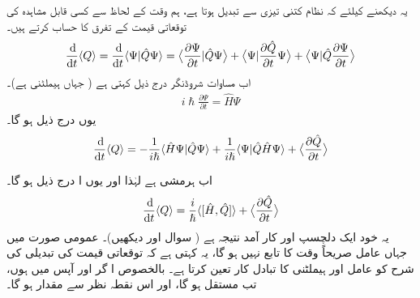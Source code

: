  یہ دیکھنے کیلئے کہ نظام کتنی تیزی سے تبدیل ہوتا ہے،   ہم  وقت کے لحاظ سے کسی قابل مشاہدہ  کی توقعاتی قیمت  کے  تفرق کا حساب  کرتے ہیں۔ 
\begin{align*}
\frac{\dif}{\dif t} \langle Q \rangle = \frac{\dif}{\dif t} \langle \Psi | \hat{Q} \Psi \rangle = \big\langle \frac{\partial\Psi}{\partial t} \vert \hat{Q} \Psi \big\rangle + \big\langle \Psi \vert \frac{\partial \hat{Q}}{\partial t} \Psi \big\rangle + \big\langle \Psi \vert \hat{Q} \frac{\partial \Psi}{\partial t} \big\rangle 
\end{align*}
اب مساوات  شروڈنگر   درج ذیل کہتی ہے (  جہاں  ہیملٹنی ہے)۔ 
\begin{align*}
i \hslash \frac{\partial \Psi}{\partial t} = \hat{H} \Psi
\end{align*}
یوں درج ذیل ہو گا۔ 
\begin{align*}
\frac{\dif}{\dif t}\langle Q\rangle =-\frac{1}{i \hslash} \langle \hat{H}\Psi | \hat{Q} \Psi\rangle+\frac{1}{i\hslash}\langle \Psi |\hat{Q} \hat{H} \Psi\rangle +\big \langle \frac{\partial \hat{Q}}{\partial t}\big \rangle
\end{align*}

اب  ہرمشی ہے لہٰذا   اور یوں ا درج ذیل ہو گا۔
\begin{align}\label{مساوات_قواعد_شرح_تبدیلی_قابل_مشاہدہ}
\frac{\dif}{\dif t} \langle Q \rangle = \frac{i}{\hslash} \langle [ \hat{H} , \hat{Q} ] \rangle + \big\langle \frac{\partial \hat{Q}}{\partial t} \big\rangle 
\end{align}
یہ  خود  ایک دلچسپ اور کار آمد نتیجہ ہے ( سوال    اور   دیکھیں)۔  عمومی   صورت میں جہاں  عامل صریحاً وقت کا تابع نہیں  ہو گا،   یہ کہتی ہے کہ توقعاتی قیمت  کی تبدیلی کی شرح کو    عامل اور ہیملٹنی کا تبادل کار تعین کرتا ہے۔ بالخصوص  ا  گر  اور   آپس میں  ہوں، تب  مستقل ہو گا،  اور اس نقطہ نظر سے   مقدار ہو گا۔

